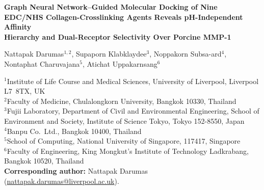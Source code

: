 \documentclass[11pt]{article}
\begin{document}
\begin{center}
{\LARGE\bfseries
Graph Neural Network--Guided Molecular Docking of Nine\\[2pt]
EDC/NHS Collagen-Crosslinking Agents Reveals pH-Independent Affinity\\[2pt]
Hierarchy and Dual-Receptor Selectivity Over Porcine MMP-1}

\vspace{1.0em}
{\large
Nattapak Darumas$^{1,2}$,
Supaporn Klabklaydee$^{3}$,
Noppakorn Subsa-ard$^{4}$,\\[2pt]
Nontaphat Charuvajana$^{5}$,
Atichat Uppakarnsang$^{6}$
}

\vspace{0.7em}
{\small
$^{1}$Institute of Life Course and Medical Sciences, University of Liverpool,
Liverpool L7~8TX, UK\\
$^{2}$Faculty of Medicine, Chulalongkorn University, Bangkok 10330, Thailand\\
$^{3}$Fujii Laboratory, Department of Civil and Environmental Engineering,
School of Environment and Society, Institute of Science Tokyo,
Tokyo 152-8550, Japan\\
$^{4}$Banpu Co.\ Ltd., Bangkok 10400, Thailand\\
$^{5}$School of Computing, National University of Singapore, 117417, Singapore\\
$^{6}$Faculty of Engineering, King Mongkut's Institute of Technology Ladkrabang,
Bangkok 10520, Thailand\\[6pt]
\textbf{Corresponding author:}
Nattapak Darumas
(\href{mailto:nattapak.darumas@liverpool.ac.uk}{nattapak.darumas@liverpool.ac.uk}).
}

\vspace{0.4em}
\end{center}
\end{document}

